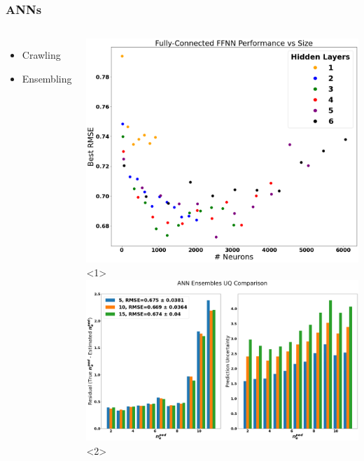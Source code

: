 \documentclass{beamer}
\begin{document}
\begin{frame}
\frametitle{ANNs}
\begin{columns}
\begin{itemize}
	\item<1-> Crawling
	\item<2-> Ensembling  
\end{itemize}
\includegraphics[scale=0.2]{../src/ANN_performace_size}<1>
\includegraphics[scale=0.135]{../src/ANN_ensemble_comp}<2>

\end{columns}

\end{frame}
\end{document}

